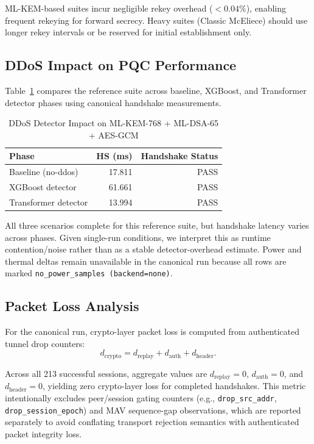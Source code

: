 \documentclass[conference]{IEEEtran}
\begin{document}
ML-KEM-based suites incur negligible rekey overhead ($< 0.04\%$), enabling frequent rekeying for forward secrecy.
Heavy suites (Classic McEliece) should use longer rekey intervals or be reserved for initial establishment only.

\subsection{DDoS Impact on PQC Performance}

Table~\ref{tab:ddos-impact} compares the reference suite across baseline, XGBoost, and Transformer detector phases using canonical handshake measurements.

\begin{table}[t]
\centering
\caption{DDoS Detector Impact on ML-KEM-768 + ML-DSA-65 + AES-GCM}
\label{tab:ddos-impact}
\small
\begin{tabular}{@{}lrr@{}}
\toprule
\textbf{Phase} & \textbf{HS (ms)} & \textbf{Handshake Status} \\
\midrule
Baseline (no-ddos) & 17.811 & PASS \\
XGBoost detector & 61.661 & PASS \\
Transformer detector & 13.994 & PASS \\
\bottomrule
\end{tabular}
\end{table}

All three scenarios complete for this reference suite, but handshake latency varies across phases.
Given single-run conditions, we interpret this as runtime contention/noise rather than as a stable detector-overhead estimate.
Power and thermal deltas remain unavailable in the canonical run because all rows are marked \texttt{no\_power\_samples (backend=none)}.

\subsection{Packet Loss Analysis}

For the canonical run, crypto-layer packet loss is computed from authenticated tunnel drop counters:
\begin{equation}
\label{eq:crypto-drop-total}
d_{\text{crypto}} = d_{\text{replay}} + d_{\text{auth}} + d_{\text{header}}.
\end{equation}

Across all 213 successful sessions, aggregate values are
$d_{\text{replay}}=0$, $d_{\text{auth}}=0$, and $d_{\text{header}}=0$,
yielding zero crypto-layer loss for completed handshakes.
This metric intentionally excludes peer/session gating counters (e.g.,
\texttt{drop\_src\_addr}, \texttt{drop\_session\_epoch}) and MAV sequence-gap observations,
which are reported separately to avoid conflating transport rejection semantics with authenticated packet integrity loss.
\end{document}
